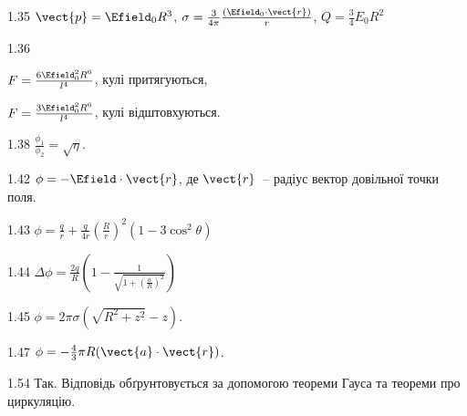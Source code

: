 \begin{Solution}{1.{35}}
	$\vect{p} = \Efield_0 R^3$,
	$\sigma = \frac{3}{4\pi} \frac{\left( \Efield_0\cdot\vect{r}\right) }{r}$,
	$Q = \frac34 E_0 R^2$
\end{Solution}
\begin{Solution}{1.{36}}
	\begin{enumerate*}[label=\alph*)]
		\item $F = \frac{6\Efield_0^2R^6}{l^4}$, кулі притягуються,
		\item $F = \frac{3\Efield_0^2R^6}{l^4}$, кулі відштовхуються.
	\end{enumerate*}
\end{Solution}
\begin{Solution}{1.{38}}
	$\frac{\phi_1}{\phi_2} =\sqrt\eta$.
\end{Solution}
\begin{Solution}{1.{42}}
	$\phi = -\Efield\cdot\vect{r}$, де $\vect{r}$~-- радіус вектор довільної точки поля.
\end{Solution}
\begin{Solution}{1.{43}}
	$\phi = \frac{q}{r} + \frac{q}{4r}\left(\frac{R}{r} \right)^2(1-3\cos^2\theta) $
\end{Solution}
\begin{Solution}{1.{44}}
	$\Delta\phi = \frac{2q}{R}\left(1 - \frac{1}{\sqrt{1 + \left(\frac{a}{R} \right)^2}}\right)$
\end{Solution}
\begin{Solution}{1.{45}}
	$\phi = 2\pi\sigma  \left( \sqrt{R^2 + z^2} - z \right) $.
\end{Solution}
\begin{Solution}{1.{47}}
	$\phi = -\frac43\pi R (\vect{a}\cdot\vect{r})$.
\end{Solution}
\begin{Solution}{1.{54}}
	Так. Відповідь обґрунтовується за допомогою теореми Гауса та теореми про циркуляцію.
\end{Solution}
